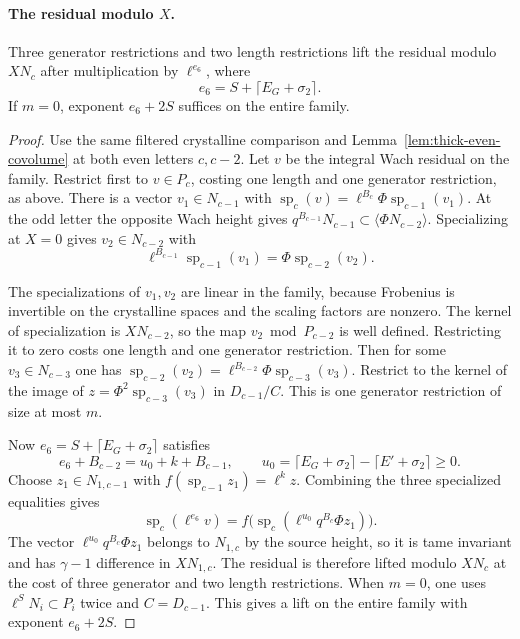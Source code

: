 \paragraph{The residual modulo \(X\).}
\begin{lemma}
Three generator restrictions and two length restrictions lift the residual modulo \(XN_c\) after multiplication by \(\ell^{e_6}\), where
\[
 e_6=S+\lceil E_G+\sigma_2\rceil.
\] If \(m=0\), exponent
\(e_6+2S\) suffices on the entire family.
\end{lemma}
\begin{proof}
Use the same filtered crystalline comparison and
Lemma~\ref{lem:thick-even-covolume} at both even letters \(c,c-2\). Let \(v\) be the
integral Wach residual on the family.
Restrict first to \(v\in P_c\), costing one length and one
generator restriction, as above. There is a vector \(v_1\in N_{c-1}\)
with \(\operatorname{sp}_c(v)=\ell^{B_c}\Phi\operatorname{sp}_{c-1}(v_1)\).
At the odd letter the opposite Wach height gives
\(q^{B_{c-1}}N_{c-1}\subset\langle\Phi N_{c-2}\rangle\).
Specializing at \(X=0\) gives \(v_2\in N_{c-2}\) with
\[
 \ell^{B_{c-1}}\operatorname{sp}_{c-1}(v_1) =\Phi\operatorname{sp}_{c-2}(v_2).
\]

The specializations of \(v_1,v_2\) are linear in the family,
because Frobenius is invertible on the crystalline spaces and the
scaling factors are nonzero. The kernel of specialization is
\(XN_{c-2}\), so the map \(v_2\bmod P_{c-2}\) is well defined.
Restricting it to zero costs one length and one generator
restriction. Then for some \(v_3\in N_{c-3}\) one has
\(\operatorname{sp}_{c-2}(v_2)
=\ell^{B_{c-2}}\Phi\operatorname{sp}_{c-3}(v_3)\).
Restrict to the kernel of the image of
\(z=\Phi^2\operatorname{sp}_{c-3}(v_3)\) in \(D_{c-1}/C\).
This is one generator restriction of size at most \(m\).

Now \(e_6=S+\lceil E_G+\sigma_2\rceil\) satisfies
\[
 e_6+B_{c-2}=u_0+k+B_{c-1},\qquad
 u_0=\lceil E_G+\sigma_2\rceil-\lceil E'+\sigma_2\rceil\ge0 .
\]
Choose \(z_1\in N_{1,c-1}\) with
\(f(\operatorname{sp}_{c-1}z_1)=\ell^k z\).
Combining the three specialized equalities gives
\[
 \operatorname{sp}_c(\ell^{e_6}v)
   = f\bigl(\operatorname{sp}_c(\ell^{u_0}q^{B_c}\Phi z_1)\bigr).
\]
The vector \(\ell^{u_0}q^{B_c}\Phi z_1\) belongs to \(N_{1,c}\)
by the source height, so it is tame invariant and has
\(\gamma-1\) difference in \(XN_{1,c}\).
The residual is therefore lifted modulo \(XN_c\) at the cost of
three generator and two length restrictions. When \(m=0\), one
uses \(\ell^S N_i\subset P_i\) twice and \(C=D_{c-1}\).
This gives a lift on the entire family with exponent \(e_6+2S\).

\end{proof}
